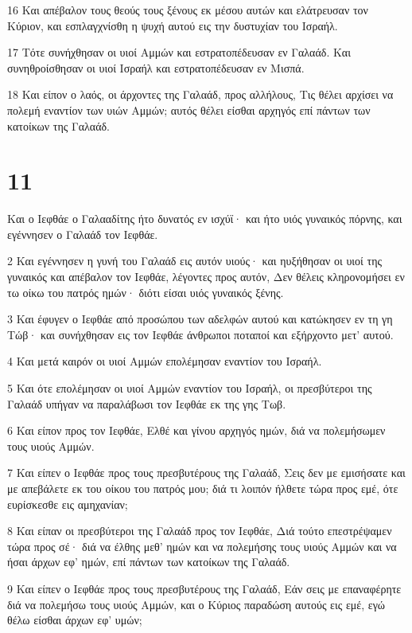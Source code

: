 \par 16 Και απέβαλον τους θεούς τους ξένους εκ μέσου αυτών και ελάτρευσαν τον Κύριον, και εσπλαγχνίσθη η ψυχή αυτού εις την δυστυχίαν του Ισραήλ.
\par 17 Τότε συνήχθησαν οι υιοί Αμμών και εστρατοπέδευσαν εν Γαλαάδ. Και συνηθροίσθησαν οι υιοί Ισραήλ και εστρατοπέδευσαν εν Μισπά.
\par 18 Και είπον ο λαός, οι άρχοντες της Γαλαάδ, προς αλλήλους, Τις θέλει αρχίσει να πολεμή εναντίον των υιών Αμμών; αυτός θέλει είσθαι αρχηγός επί πάντων των κατοίκων της Γαλαάδ.

\chapter{11}

\par Και ο Ιεφθάε ο Γαλααδίτης ήτο δυνατός εν ισχύϊ· και ήτο υιός γυναικός πόρνης, και εγέννησεν ο Γαλαάδ τον Ιεφθάε.
\par 2 Και εγέννησεν η γυνή του Γαλαάδ εις αυτόν υιούς· και ηυξήθησαν οι υιοί της γυναικός και απέβαλον τον Ιεφθάε, λέγοντες προς αυτόν, Δεν θέλεις κληρονομήσει εν τω οίκω του πατρός ημών· διότι είσαι υιός γυναικός ξένης.
\par 3 Και έφυγεν ο Ιεφθάε από προσώπου των αδελφών αυτού και κατώκησεν εν τη γη Τώβ· και συνήχθησαν εις τον Ιεφθάε άνθρωποι ποταποί και εξήρχοντο μετ' αυτού.
\par 4 Και μετά καιρόν οι υιοί Αμμών επολέμησαν εναντίον του Ισραήλ.
\par 5 Και ότε επολέμησαν οι υιοί Αμμών εναντίον του Ισραήλ, οι πρεσβύτεροι της Γαλαάδ υπήγαν να παραλάβωσι τον Ιεφθάε εκ της γης Τωβ.
\par 6 Και είπον προς τον Ιεφθάε, Ελθέ και γίνου αρχηγός ημών, διά να πολεμήσωμεν τους υιούς Αμμών.
\par 7 Και είπεν ο Ιεφθάε προς τους πρεσβυτέρους της Γαλαάδ, Σεις δεν με εμισήσατε και με απεβάλετε εκ του οίκου του πατρός μου; διά τι λοιπόν ήλθετε τώρα προς εμέ, ότε ευρίσκεσθε εις αμηχανίαν;
\par 8 Και είπαν οι πρεσβύτεροι της Γαλαάδ προς τον Ιεφθάε, Διά τούτο επεστρέψαμεν τώρα προς σέ· διά να έλθης μεθ' ημών και να πολεμήσης τους υιούς Αμμών και να ήσαι άρχων εφ' ημών, επί πάντων των κατοίκων της Γαλαάδ.
\par 9 Και είπεν ο Ιεφθάε προς τους πρεσβυτέρους της Γαλαάδ, Εάν σεις με επαναφέρητε διά να πολεμήσω τους υιούς Αμμών, και ο Κύριος παραδώση αυτούς εις εμέ, εγώ θέλω είσθαι άρχων εφ' υμών;
